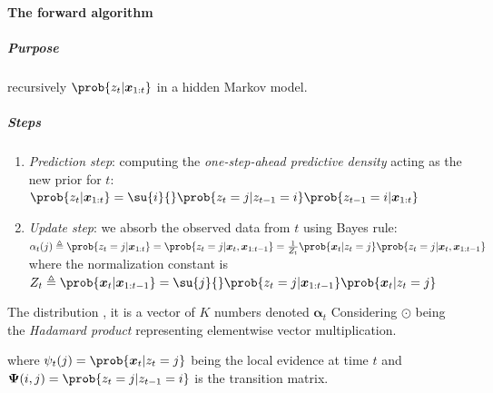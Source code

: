 \paragraph{The forward algorithm}
\subparagraph{Purpose} recursively  
$\prob{z_{t}|\bm{x}_{1:t}}$ in a hidden Markov model.
\subparagraph{Steps}
\begin{enumerate}
    \item \emph{Prediction step}: computing the \emph{one-step-ahead predictive 
        density} acting as the new prior for $t$:\\ $\prob{z_{t}|\bm{x}_{1:t}} =
        \su{i}{} \prob{z_{t}=j| z_{t-1}=i}\prob{z_{t-1}=i|\bm{x}_{1:t}}$
    \item \emph{Update step}: we absorb the observed data from $t$ using Bayes rule:\\
        $\alpha_{t}(j) \triangleq \prob{z_{t}=j| \bm{x}_{1:t}} = \prob{z_{
            t}=j| \bm{x}_{t}, \bm{x}_{1:t-1}} = \frac{1}{Z_{t}}\prob{\bm{x}_{
        t}|z_{t}=j} \prob{z_{t}=j| \bm{x}_{t}, \bm{x}_{1:t-1}}$ 
        where  the normalization constant is $Z_{t} \triangleq \prob{\bm{x}_{t}|
        \bm{x}_{1:t-1}}=\su{j}{}\prob{z_{t}=j|\bm{x}_{1:t-1}}\prob{\bm{x}_{t}|z_{t}=j}$
\end{enumerate}
The distribution ,
it is a vector of $K$ numbers denoted $\bm{\alpha}_{t}$
Considering $\odot$ being the \emph{Hadamard product} representing elementwise vector multiplication.
\begin{center}
\end{center}
where $\psi_{t}(j) = \prob{\bm{x}_{t}|z_{t}=j}$ being the local evidence at time $t$ and $\bm{\Psi}(
i,j)=\prob{z_{t}=j|z_{t-1}=i}$ is the transition matrix.

